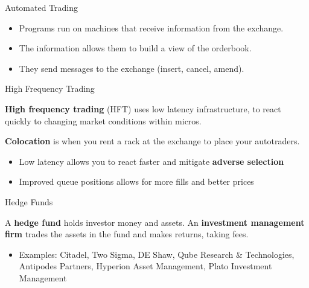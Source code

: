 \begin{frame}{Automated Trading}
  \begin{itemize}
    \item Programs run on machines that receive information from the exchange.
    \item The information allows them to build a view of the orderbook.
    \item They send messages to the exchange (insert, cancel, amend).
  \end{itemize}

  \begin{center}
    
  \end{center}
\end{frame}

\begin{frame}{High Frequency Trading}
  \begin{sqt:definition}
    \textbf{High frequency trading} (HFT) uses low latency infrastructure, to react
    quickly to changing market conditions within micros.
  \end{sqt:definition}

  \begin{sqt:definition}
    \textbf{Colocation} is when you rent a rack at the exchange to place your autotraders.
  \end{sqt:definition}

  \begin{itemize}
    \item Low latency allows you to react faster and mitigate \textbf{adverse selection}
    \item Improved queue positions allows for more fills and better prices
  \end{itemize}
\end{frame}

\begin{frame}{Hedge Funds}
  \begin{sqt:definition}
    A \textbf{hedge fund} holds investor money and assets.
    An \textbf{investment management firm} trades the assets in the fund and makes returns,
    taking fees.
  \end{sqt:definition}

  \begin{itemize}
    \item Examples: Citadel, Two Sigma, DE Shaw, Qube Research \& Technologies, Antipodes Partners, 
    Hyperion Asset Management, Plato Investment Management
  \end{itemize}
\end{frame}

